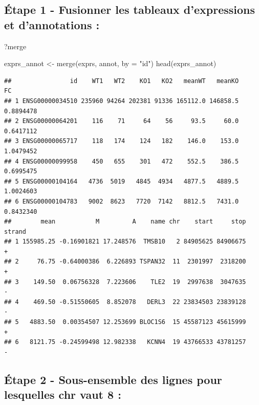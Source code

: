 \documentclass[
]{book}
\newenvironment{Shaded}{\begin{snugshade}}{\end{snugshade}}
\newcommand{\AttributeTok}[1]{\textcolor[rgb]{0.77,0.63,0.00}{#1}}
\newcommand{\FunctionTok}[1]{\textcolor[rgb]{0.00,0.00,0.00}{#1}}
\newcommand{\NormalTok}[1]{#1}
\newcommand{\OtherTok}[1]{\textcolor[rgb]{0.56,0.35,0.01}{#1}}
\newcommand{\StringTok}[1]{\textcolor[rgb]{0.31,0.60,0.02}{#1}}
\begin{document}
\hypertarget{uxe9tape-1---fusionner-les-tableaux-dexpressions-et-dannotations}{%
\subsection{Étape 1 - Fusionner les tableaux d'expressions et d'annotations :}\label{uxe9tape-1---fusionner-les-tableaux-dexpressions-et-dannotations}}

\begin{Shaded}
\begin{Highlighting}[]
\NormalTok{?merge}
\end{Highlighting}
\end{Shaded}

\begin{Shaded}
\begin{Highlighting}[]
\NormalTok{exprs\_annot }\OtherTok{\textless{}{-}} \FunctionTok{merge}\NormalTok{(exprs, annot, }\AttributeTok{by =} \StringTok{"id"}\NormalTok{)}
\FunctionTok{head}\NormalTok{(exprs\_annot)}
\end{Highlighting}
\end{Shaded}

\begin{verbatim}
##                id    WT1   WT2    KO1   KO2   meanWT   meanKO        FC
## 1 ENSG00000034510 235960 94264 202381 91336 165112.0 146858.5 0.8894478
## 2 ENSG00000064201    116    71     64    56     93.5     60.0 0.6417112
## 3 ENSG00000065717    118   174    124   182    146.0    153.0 1.0479452
## 4 ENSG00000099958    450   655    301   472    552.5    386.5 0.6995475
## 5 ENSG00000104164   4736  5019   4845  4934   4877.5   4889.5 1.0024603
## 6 ENSG00000104783   9002  8623   7720  7142   8812.5   7431.0 0.8432340
##        mean           M         A    name chr    start     stop strand
## 1 155985.25 -0.16901821 17.248576  TMSB10   2 84905625 84906675      +
## 2     76.75 -0.64000386  6.226893 TSPAN32  11  2301997  2318200      +
## 3    149.50  0.06756328  7.223606    TLE2  19  2997638  3047635      -
## 4    469.50 -0.51550605  8.852078   DERL3  22 23834503 23839128      -
## 5   4883.50  0.00354507 12.253699 BLOC1S6  15 45587123 45615999      +
## 6   8121.75 -0.24599498 12.982338   KCNN4  19 43766533 43781257      -
\end{verbatim}

\hypertarget{uxe9tape-2---sous-ensemble-des-lignes-pour-lesquelles-chr-vaut-8}{%
\subsection{Étape 2 - Sous-ensemble des lignes pour lesquelles chr vaut 8 :}\label{uxe9tape-2---sous-ensemble-des-lignes-pour-lesquelles-chr-vaut-8}}
\end{document}
